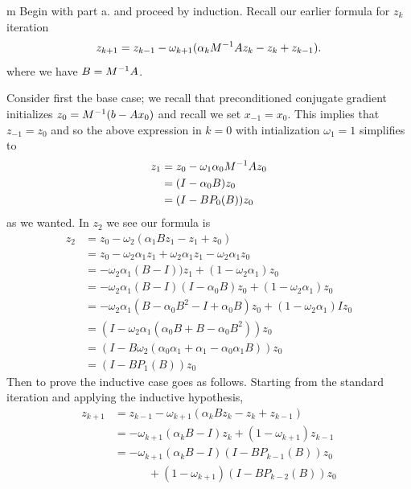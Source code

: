 \documentclass[11pt]{article}
\begin{document}
\begin{my proof}{m}
Begin with part a. and proceed by induction. Recall our earlier formula for $z_k$ iteration \begin{gather*}
z_{k+1} = z_{k-1} - \omega_{k+1}(\alpha_{k} M^{-1} A z_{k} - z_{k} + z_{k-1}).
\end{gather*}
where we have $B = M^{-1} A$.

Consider first the base case; we recall that preconditioned conjugate gradient initializes $z_0  = M^{-1} (b - Ax_0)$ and recall we set $x_{-1} = x_0$. This implies that $z_{-1} = z_0$ and so the above expression in $k=0$ with intialization $\omega_1 = 1$ simplifies to \begin{align*}
z_{1} &= z_{0} - \omega_{1}\alpha_{0} M^{-1} A z_{0} \\
&= (I - \alpha_0 B) z_0 \\
&= (I - BP_0(B)) z_0
\end{align*}
as we wanted. In $z_2$ we see our formula is \begin{align*}
z_{2} &= z_{0} - \omega_{2}(\alpha_{1} B z_{1} - z_{1} + z_{0}) \\
&= z_0 - \omega_2 \alpha_1 z_1 + \omega_2 \alpha_1 z_1 - \omega_2 \alpha_1 z_0\\
&= -\omega_2 \alpha_1 (B - I))z_1 + (1 - \omega_2 \alpha_1) z_0 \\
&=  - \omega_2 \alpha_1 (B - I)(I - \alpha_0 B) z_0 + (1 - \omega_2 \alpha_1) z_0 \\
&= - \omega_2 \alpha_1 (B - \alpha_0 B^2 - I + \alpha_0 B) z_0 + (1 - \omega_2 \alpha_1) I z_0 \\
&= (I - \omega_2 \alpha_1 (\alpha_0 B + B - \alpha_0 B^2)) z_0 \\
&= (I - B \omega_2  (\alpha_0 \alpha_1 + \alpha_1 - \alpha_0 \alpha_1 B)) z_0 \\
&= (I - B P_1 (B) ) z_0 
\end{align*}
Then to prove the inductive case goes as follows. Starting from the standard iteration and applying the inductive hypothesis, \begin{align*}
z_{k+1} &= z_{k-1} - \omega_{k+1}(\alpha_{k} B z_{k} - z_{k} + z_{k-1}) \\
&= - \omega_{k+1}(\alpha_k B - I) z_k + (1 - \omega_{k+1}) z_{k-1} \\
&= - \omega_{k+1}(\alpha_k B - I) (I - BP_{k-1}(B))z_0 \\
& \hspace{3em} + (1 - \omega_{k+1}) (I - B P_{k-2}(B))z_0 \\

\end{align*}
\end{my proof}
\end{document}
